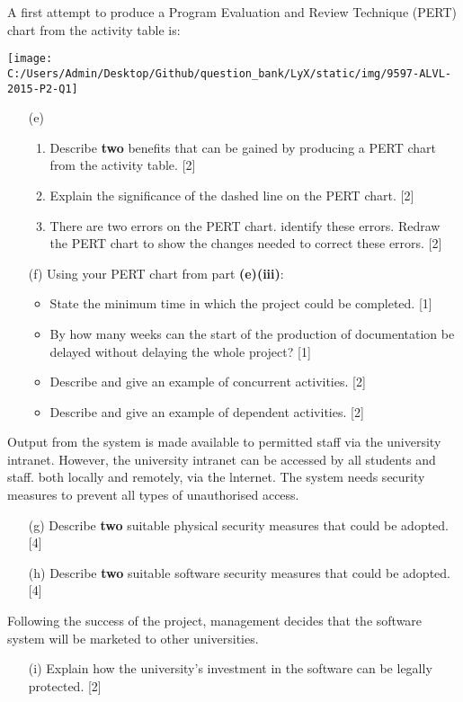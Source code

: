 A first attempt to produce a Program Evaluation and Review Technique
(PERT) chart from the activity table is: 
\begin{center}
\texttt{[image: C:/Users/Admin/Desktop/Github/question\_bank/LyX/static/img/9597-ALVL-2015-P2-Q1]}
\par\end{center}
\begin{enumerate}
\item[(e)] {}
\begin{enumerate}
\item Describe \textbf{two} benefits that can be gained by producing a PERT
chart from the activity table. \hfill{}{[}2{]}
\item Explain the significance of the dashed line on the PERT chart. \hfill{}{[}2{]}
\item There are two errors on the PERT chart. identify these errors. Redraw
the PERT chart to show the changes needed to correct these errors.
\hfill{}{[}2{]}
\end{enumerate}
\item[(f)]  Using your PERT chart from part \textbf{(e)(iii)}: 
\begin{itemize}
\item State the minimum time in which the project could be completed.\hfill{}
{[}1{]}
\item By how many weeks can the start of the production of documentation
be delayed without delaying the whole project? \hfill{}{[}1{]}
\item Describe and give an example of concurrent activities.\hfill{} {[}2{]}
\item Describe and give an example of dependent activities. \hfill{}{[}2{]}
\end{itemize}
\end{enumerate}
Output from the system is made available to permitted staff via the
university intranet. However, the university intranet can be accessed
by all students and staff. both locally and remotely, via the lnternet.
The system needs security measures to prevent all types of unauthorised
access. 
\begin{enumerate}
\item[(g)]  Describe\textbf{ two} suitable physical security measures that could
be adopted. \hfill{}{[}4{]}
\item[(h)]  Describe \textbf{two} suitable software security measures that could
be adopted. \hfill{}{[}4{]}
\end{enumerate}
Following the success of the project, management decides that the
software system will be marketed to other universities. 
\begin{enumerate}
\item[(i)]  Explain how the university's investment in the software can be legally
protected. \hfill{}{[}2{]}
\end{enumerate}